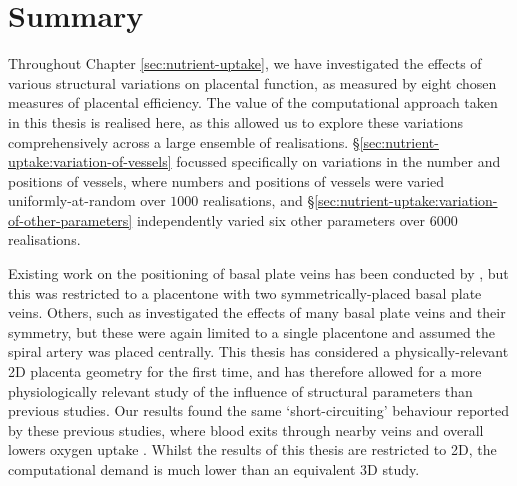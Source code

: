     \section{Summary} \label{sec:nutrient-uptake:summary}        
        Throughout Chapter \ref{sec:nutrient-uptake}, we have investigated the effects of various structural variations on placental function, as measured by eight chosen measures of placental efficiency. The value of the computational approach taken in this thesis is realised here, as this allowed us to explore these variations comprehensively across a large ensemble of realisations. \S\ref{sec:nutrient-uptake:variation-of-vessels} focussed specifically on variations in the number and positions of vessels, where numbers and positions of vessels were varied uniformly-at-random over $1000$ realisations, and \S\ref{sec:nutrient-uptake:variation-of-other-parameters} independently varied six other parameters over $6000$ realisations.

        Existing work on the positioning of basal plate veins has been conducted by \citeauthor{chernyavskyMathematicalModelIntervillous2010} \cite{chernyavskyMathematicalModelIntervillous2010}, but this was restricted to a placentone with two symmetrically-placed basal plate veins. Others, such as \citeauthor{meklerImpactTissuePorosity2022} \cite{meklerImpactTissuePorosity2022} investigated the effects of many basal plate veins and their symmetry, but these were again limited to a single placentone and assumed the spiral artery was placed centrally. This thesis has considered a physically-relevant 2D placenta geometry for the first time, and has therefore allowed for a more physiologically relevant study of the influence of structural parameters than previous studies. Our results found the same `short-circuiting' behaviour reported by these previous studies, where blood exits through nearby veins and overall lowers oxygen uptake \cite{chernyavskyMathematicalModelIntervillous2010,meklerImpactTissuePorosity2022}. Whilst the results of this thesis are restricted to 2D, the computational demand is much lower than an equivalent 3D study.

